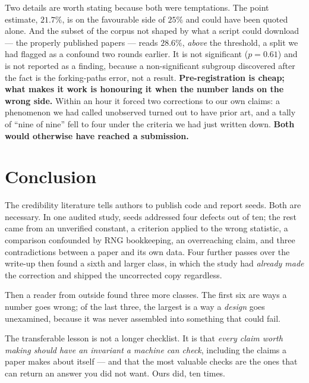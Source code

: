 \documentclass[conference]{IEEEtran}
\begin{document}
Two details are worth stating because both were temptations. The point estimate, $21.7\%$, is on
the favourable side of $25\%$ and could have been quoted alone. And the subset of the corpus not
shaped by what a script could download --- the properly published papers --- reads $28.6\%$,
\emph{above} the threshold, a split we had flagged as a confound two rounds earlier. It is not
significant ($p = 0.61$) and is not reported as a finding, because a non-significant subgroup
discovered after the fact is the forking-paths error, not a result. \textbf{Pre-registration is
cheap; what makes it work is honouring it when the number lands on the wrong side.} Within an hour it forced two corrections to our own claims: a phenomenon we had
called unobserved turned out to have prior art, and a tally of ``nine of nine'' fell to four under
the criteria we had just written down. \textbf{Both would otherwise have reached a submission.}

\section{Conclusion}
The credibility literature tells authors to publish code and report seeds. Both are necessary. In
one audited study, seeds addressed four defects out of ten; the rest came from an unverified
constant, a criterion applied to the wrong statistic, a comparison confounded by RNG bookkeeping, an
overreaching claim, and three contradictions between a paper and its own data. Four further passes
over the write-up then found a sixth and larger class, in which the study had \emph{already made}
the correction and shipped the uncorrected copy regardless.

Then a reader from outside found three more classes. The first six are ways a
number goes wrong; of the last three, the largest is a way a \emph{design} goes unexamined,
because it was never assembled into something that could fail.

The transferable lesson is not a longer checklist. It is that \emph{every claim worth making should
have an invariant a machine can check}, including the claims a paper makes about itself --- and that
the most valuable checks are the ones that can return an answer you did not want. Ours did, ten
times.



\end{document}
